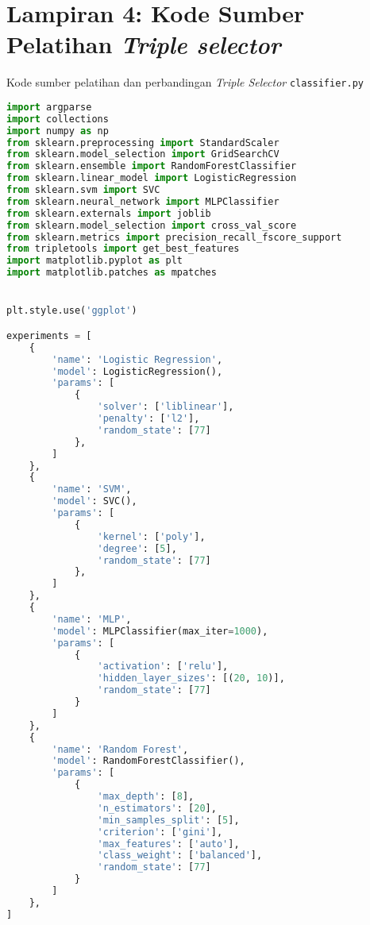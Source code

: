 \chapter*{Lampiran 4: Kode Sumber Pelatihan \textit{Triple selector}}

Kode sumber pelatihan dan perbandingan \textit{Triple Selector} \verb|classifier.py|

\begin{lstlisting}[language=Python]
import argparse
import collections
import numpy as np
from sklearn.preprocessing import StandardScaler
from sklearn.model_selection import GridSearchCV
from sklearn.ensemble import RandomForestClassifier
from sklearn.linear_model import LogisticRegression
from sklearn.svm import SVC
from sklearn.neural_network import MLPClassifier
from sklearn.externals import joblib
from sklearn.model_selection import cross_val_score
from sklearn.metrics import precision_recall_fscore_support
from tripletools import get_best_features
import matplotlib.pyplot as plt
import matplotlib.patches as mpatches


plt.style.use('ggplot')

experiments = [
    {
        'name': 'Logistic Regression',
        'model': LogisticRegression(),
        'params': [
            {
                'solver': ['liblinear'],
                'penalty': ['l2'],
                'random_state': [77]
            },
        ]
    },
    {
        'name': 'SVM',
        'model': SVC(),
        'params': [
            {
                'kernel': ['poly'],
                'degree': [5],
                'random_state': [77]
            },
        ]
    },
    {
        'name': 'MLP',
        'model': MLPClassifier(max_iter=1000),
        'params': [
            {
                'activation': ['relu'],
                'hidden_layer_sizes': [(20, 10)],
                'random_state': [77]
            }
        ]
    },
    {
        'name': 'Random Forest',
        'model': RandomForestClassifier(),
        'params': [
            {
                'max_depth': [8],
                'n_estimators': [20],
                'min_samples_split': [5],
                'criterion': ['gini'],
                'max_features': ['auto'],
                'class_weight': ['balanced'],
                'random_state': [77]
            }
        ]
    },
]


\end{lstlisting}
